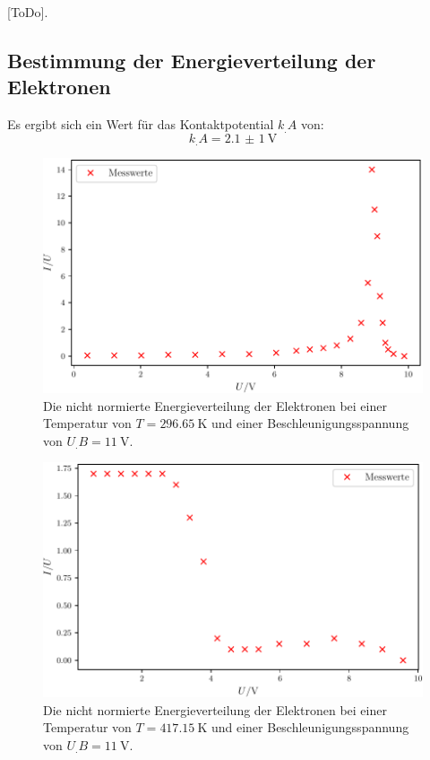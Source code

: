 \begin{table}
\centering
\caption{[ToDo].}

\label{tab:Abstände}
\end{table}

\subsection{Bestimmung der Energieverteilung der Elektronen}

Es ergibt sich ein Wert für das Kontaktpotential $k_.A$ von:
\[
k_.A = \SI{2,1(1)}{\volt}
\]

\begin{figure}
\centering
\includegraphics[width=\linewidth-70pt,height=\textheight-70pt,keepaspectratio]{content/images/fig1.pdf}
\caption{Die nicht normierte Energieverteilung der Elektronen bei einer Temperatur von $T=\SI{296,65}{\kelvin}$ und einer Beschleunigungsspannung von $U_.B=\SI{11}{\volt}$.}
\label{fig:1}
\end{figure}

\begin{figure}
\centering
\includegraphics[width=\linewidth-70pt,height=\textheight-70pt,keepaspectratio]{content/images/fig2.pdf}
\caption{Die nicht normierte Energieverteilung der Elektronen bei einer Temperatur von $T=\SI{417,15}{\kelvin}$ und einer Beschleunigungsspannung von $U_.B=\SI{11}{\volt}$.}
\label{fig:2}
\end{figure}

